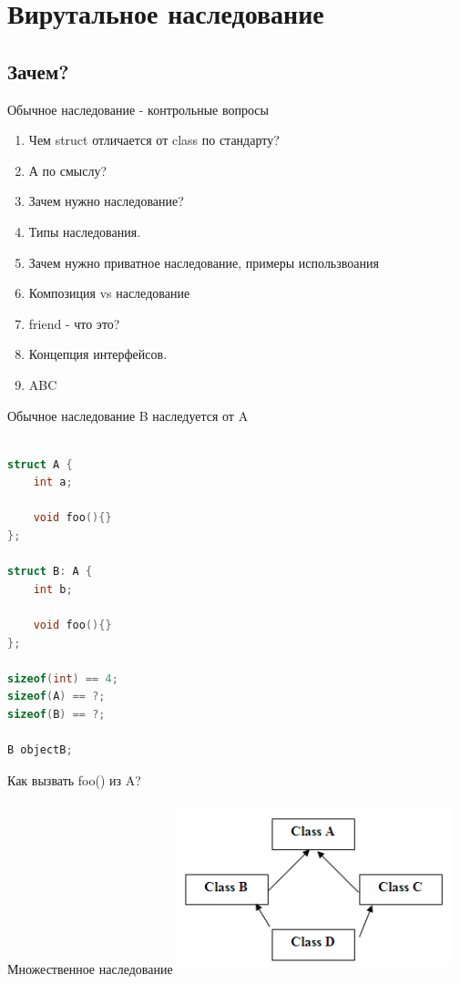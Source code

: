 \documentclass[10pt]{beamer}
\begin{document}
\section{Вирутальное наследование}
\subsection{Зачем?}

\begin{frame}[fragile]{Обычное наследование - контрольные вопросы}
\begin{enumerate}
\item Чем struct отличается от class по стандарту?
\item А по смыслу?
\item Зачем нужно наследование?
\item Типы наследования.
\item Зачем нужно приватное наследование, примеры использвоания
\item Композиция vs наследование
\item friend - что это?
\item Концепция интерфейсов.
\item ABC
\end{enumerate}
\end{frame}

\begin{frame}[fragile]{Обычное наследование}
B наследуется от A
\begin{lstlisting}[language=C++]

struct A {
    int a;
    
    void foo(){}
};

struct B: A {
    int b;
    
    void foo(){}
};

sizeof(int) == 4;
sizeof(A) == ?;
sizeof(B) == ?;

B objectB;
\end{lstlisting}
Как вызвать foo() из A?
\end{frame}

\begin{frame}[fragile]{Множественное наследование}
\includegraphics[width=8cm, height=5cm]{Term_3/Source/Pictures/virtual-inheritance.png}
\end{frame}
\end{document}
